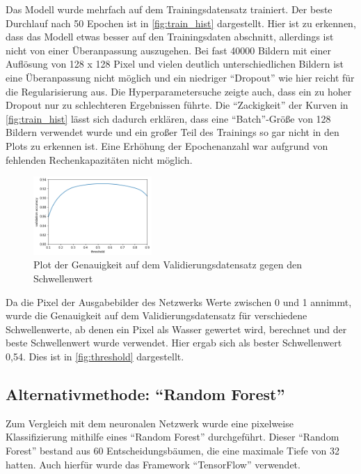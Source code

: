 Das Modell wurde mehrfach auf dem Trainingsdatensatz trainiert. 
Der beste Durchlauf nach 50 Epochen ist in \autoref{fig:train_hist} dargestellt.
Hier ist zu erkennen, dass das Modell etwas besser auf den Trainingsdaten abschnitt, allerdings ist nicht von einer Überanpassung auszugehen.
Bei fast 40000 Bildern mit einer Auflösung von 128 x 128 Pixel und vielen deutlich unterschiedlichen Bildern ist eine Überanpassung nicht möglich 
und ein niedriger \enquote{Dropout} wie hier reicht für die Regularisierung aus.
Die Hyperparametersuche zeigte auch, dass ein zu hoher Dropout nur zu schlechteren Ergebnissen führte.
Die \enquote{Zackigkeit} der Kurven in \autoref{fig:train_hist} lässt sich dadurch erklären, dass eine \enquote{Batch}-Größe von 128 Bildern verwendet wurde und ein großer Teil des Trainings so gar nicht in den Plots zu erkennen ist.
Eine Erhöhung der Epochenanzahl war aufgrund von fehlenden Rechenkapazitäten nicht möglich.


\begin{figure}
    \centering
    \includegraphics[width=0.4\textwidth]{images/threshold.png}
    \captionsetup{format=plain}
    \caption{Plot der Genauigkeit auf dem Validierungsdatensatz gegen den Schwellenwert}
    \label{fig:threshold}
\end{figure}

Da die Pixel der Ausgabebilder des Netzwerks Werte zwischen 0 und 1 annimmt, wurde die Genauigkeit auf dem Validierungsdatensatz
für verschiedene Schwellenwerte, ab denen ein Pixel als Wasser gewertet wird, berechnet und der beste Schwellenwert wurde verwendet.
Hier ergab sich als bester Schwellenwert 0,54.
Dies ist in \autoref{fig:threshold} dargestellt.
\FloatBarrier

\subsection{Alternativmethode: \enquote{Random Forest}}
\label{ssec:Alternativmethode}

Zum Vergleich mit dem neuronalen Netzwerk wurde eine pixelweise Klassifizierung mithilfe eines \enquote{Random Forest} durchgeführt.
Dieser \enquote{Random Forest} bestand aus 60 Entscheidungsbäumen, die eine maximale Tiefe von 32 hatten.
Auch hierfür wurde das Framework \enquote{TensorFlow} verwendet.\cite{tfdf}

